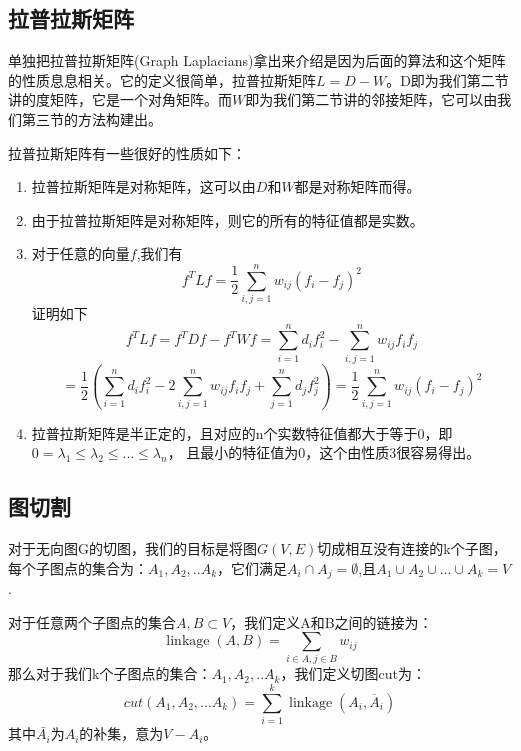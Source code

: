 \subsection{拉普拉斯矩阵}
单独把拉普拉斯矩阵(Graph Laplacians)拿出来介绍是因为后面的算法和这个矩阵的性质息息相关。它的定义很简单，拉普拉斯矩阵$L=D-W$。D即为我们第二节讲的度矩阵，它是一个对角矩阵。而$W$即为我们第二节讲的邻接矩阵，它可以由我们第三节的方法构建出。

拉普拉斯矩阵有一些很好的性质如下：
\begin{enumerate}
    \item 拉普拉斯矩阵是对称矩阵，这可以由$D$和$W$都是对称矩阵而得。
    \item 由于拉普拉斯矩阵是对称矩阵，则它的所有的特征值都是实数。
    \item 对于任意的向量$f$,我们有
    \begin{equation*}
    f^TLf = \frac{1}{2}\sum\limits_{i,j=1}^{n}w_{ij}(f_i-f_j)^2
    \end{equation*}
    证明如下
    \begin{equation*}
    f^TLf = f^TDf - f^TWf = \sum\limits_{i=1}^{n}d_if_i^2 - \sum\limits_{i,j=1}^{n}w_{ij}f_if_j
    \end{equation*}
    \begin{equation*}
    =\frac{1}{2}( \sum\limits_{i=1}^{n}d_if_i^2 - 2 \sum\limits_{i,j=1}^{n}w_{ij}f_if_j + \sum\limits_{j=1}^{n}d_jf_j^2) = \frac{1}{2}\sum\limits_{i,j=1}^{n}w_{ij}(f_i-f_j)^2
    \end{equation*}
    \item 拉普拉斯矩阵是半正定的，且对应的n个实数特征值都大于等于0，即$0 =\lambda_1 \leq \lambda_2 \leq... \leq \lambda_n$， 且最小的特征值为0，这个由性质3很容易得出。
\end{enumerate}

\subsection{图切割}
        
对于无向图G的切图，我们的目标是将图$G(V,E)$切成相互没有连接的k个子图，每个子图点的集合为：$A_1,A_2,..A_k$，它们满足$A_i \cap A_j = \emptyset$,且$A_1 \cup A_2 \cup ... \cup A_k = V$.

对于任意两个子图点的集合$A, B \subset V$，我们定义A和B之间的链接为：
\begin{equation*}
\operatorname{linkage}(A, B) = \sum\limits_{i \in A, j \in B}w_{ij}
\end{equation*}
那么对于我们k个子图点的集合：$A_1,A_2,..A_k$，我们定义切图cut为：
\begin{equation*}
cut(A_1,A_2,...A_k) = \sum\limits_{i=1}^{k}\operatorname{linkage}(A_i, \overline{A}_i )
\end{equation*}
其中$\bar{A_i}$为$A_i$的补集，意为$V - A_i$。

